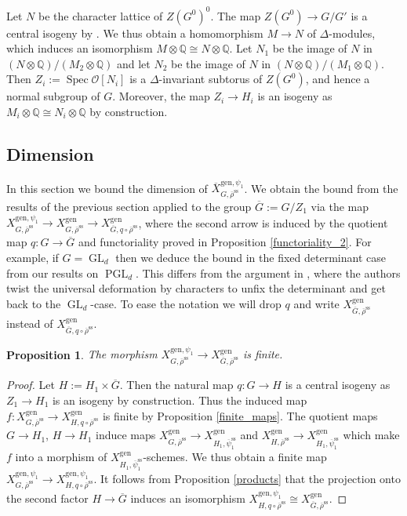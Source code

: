 \documentclass{amsart}
\newtheorem{prop}{Proposition}[section]
\theoremstyle{definition}
\theoremstyle{remark}
\DeclareMathOperator{\GL}{GL}
\DeclareMathOperator{\Spec}{Spec}
\newcommand{\QQ}{\mathbb Q}
\newcommand{\OO}{\mathcal O}
\newcommand{\rhobar}{\overline{\rho}}
\newcommand{\gen}{\mathrm{gen}}
\DeclareMathOperator{\PGL}{PGL}
\newcommand{\Xbar}{\overline{X}}
\newcommand{\rhobarss}{\rhobar^{\mathrm{ss}}}
\newcommand{\Gbar}{\overline{G}}
\newcommand{\psibar}{\overline{\psi}}
\newcommand{\psibarss}{\psibar^{\mathrm {ss}}}
\begin{document}
Let $N$ be the character lattice of $Z(G^0)^0$. The map $Z(G^0)\rightarrow G/G'$ is a central isogeny by \cite[Corollary 5.3.3]{bcnrd}.
We thus obtain a homomorphism $M\rightarrow N$ of $\Delta$-modules, which induces an isomorphism $M \otimes \QQ\cong N\otimes \QQ$.
Let $N_1$ be the image of $N$ in $(N\otimes \QQ)/ (M_2\otimes\QQ)$ and let $N_2$ be the image of $N$ in $(N\otimes \QQ)/ (M_1\otimes\QQ)$.
Then $Z_i:=\Spec \OO[N_i]$ is a $\Delta$-invariant subtorus of $Z(G^0)$, and hence
a normal subgroup of $G$. Moreover, the map $Z_i\rightarrow H_i$ is an isogeny as  $M_i\otimes \QQ\cong N_i\otimes\QQ$ by construction.

\subsection{Dimension} In this section we bound the dimension of $\Xbar^{\gen, \psi_1}_{G, \rhobarss}$. 
We  obtain the bound from the results of the previous section applied to the group $\Gbar:= G/Z_1$ 
via the map $X^{\gen, \psi_1}_{G, \rhobarss} \rightarrow X^{\gen}_{G, \rhobarss} \rightarrow X^{\gen}_{\Gbar, q\circ\rhobarss}$, where the second arrow is induced 
by the quotient map $q: G\rightarrow \Gbar$ and functoriality proved in Proposition \ref{functoriality_2}. 
For example, if $G=\GL_d$ then we deduce the bound in the fixed determinant case from our results on $\PGL_d$. This differs 
from the argument in \cite{BIP_new}, where the authors twist the universal deformation by characters to unfix the determinant and get back to the $\GL_d$-case. 
To ease the notation we will drop $q$ and write 
$X^{\gen}_{\Gbar, \rhobarss}$ instead of  $X^{\gen}_{\Gbar, q\circ\rhobarss}$. 

\begin{prop}\label{psi_Gbar_finite} The morphism $X^{\gen, \psi_1}_{G, \rhobarss}\rightarrow X^{\gen}_{\Gbar, \rhobarss}$ is finite. 
\end{prop}
\begin{proof} Let $H:= H_1 \times \Gbar$. Then the natural map $q: G\rightarrow H$ 
is a central isogeny as $Z_1\rightarrow H_1$ is an isogeny by construction.
 Thus the induced 
map $f: X^{\gen}_{G, \rhobarss}\rightarrow X^{\gen}_{H, q\circ \rhobarss}$ is finite by Proposition 
\ref{finite_maps}. The quotient maps $ G\rightarrow H_1$, $ H\rightarrow H_1$ induce 
maps $X^{\gen}_{G, \rhobarss}\rightarrow X^{\gen}_{H_1, \psibarss_1}$ and 
$X^{\gen}_{H, \rhobarss}\rightarrow X^{\gen}_{H_1, \psibarss_1}$ which make
$f$ into a morphism of $X^{\gen}_{H_1, \psibarss_1}$-schemes. We thus obtain a finite map 
$ X^{\gen, \psi_1}_{G, \rhobarss}\rightarrow X^{\gen, \psi_1}_{H, q\circ \rhobarss}$. 
It follows from Proposition \ref{products} that the projection onto the second factor 
$H\rightarrow \Gbar$ induces an isomorphism  $X^{\gen, \psi_1}_{H, q\circ \rhobarss} \cong X^{\gen}_{\Gbar, \rhobarss}$. 
\end{proof} 
\end{document}

